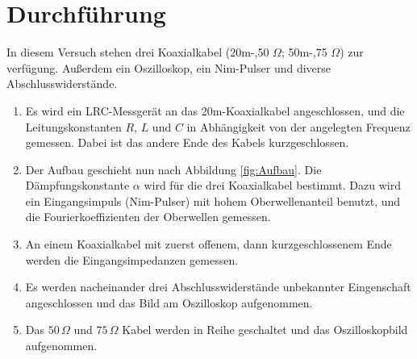 

\section{Durchführung}
In diesem Versuch stehen drei Koaxialkabel (20m-,50 $\Omega$; 50m-,75 $\Omega$) 
zur 
verfügung. Außerdem ein Oszilloskop, ein Nim-Pulser und diverse 
Abschlusswiderstände.

\begin{enumerate}
\item 	Es wird ein LRC-Messgerät an das 20m-Koaxialkabel angeschlossen, und die 
		Leitungskonstanten $R$, $L$ und $C$ in Abhängigkeit von der angelegten 
		Frequenz gemessen. Dabei ist das andere Ende des Kabels kurzgeschlossen.

\item 	Der Aufbau geschieht nun nach Abbildung \ref{fig:Aufbau}. 
		Die Dämpfungskonstante $\alpha$ wird für die drei Koaxialkabel bestimmt. 
		Dazu wird ein Eingangsimpuls (Nim-Pulser) mit hohem Oberwellenanteil  
		benutzt, und die 
		Fourierkoeffizienten der Oberwellen gemessen.
		
\item 	An einem Koaxialkabel mit zuerst offenem, dann kurzgeschlossenem Ende 
		werden die Eingangsimpedanzen gemessen.	
		
\item	Es werden 
		nacheinander drei Abschlusswiderstände unbekannter Eingenschaft 
		angeschlossen und das Bild am Oszilloskop aufgenommen.

\item	Das $50 \,\Omega$ und $75 \, \Omega$ Kabel werden in Reihe geschaltet und 
		das	Oszilloskopbild aufgenommen.
		
		
\end{enumerate}

